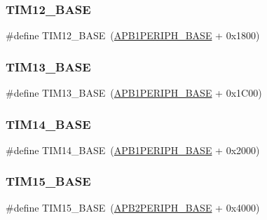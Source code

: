 \subsubsection{\texorpdfstring{TIM12\_BASE}{TIM12\_BASE}}
{\footnotesize\ttfamily \#define T\+I\+M12\+\_\+\+B\+A\+SE~(\mbox{\hyperlink{group___peripheral__memory__map_ga45666d911f39addd4c8c0a0ac3388cfb}{A\+P\+B1\+P\+E\+R\+I\+P\+H\+\_\+\+B\+A\+SE}} + 0x1800)}

\mbox{\label{group___peripheral__memory__map_gad20f79948e9359125a40bbf6ed063590}} 
\subsubsection{\texorpdfstring{TIM13\_BASE}{TIM13\_BASE}}
{\footnotesize\ttfamily \#define T\+I\+M13\+\_\+\+B\+A\+SE~(\mbox{\hyperlink{group___peripheral__memory__map_ga45666d911f39addd4c8c0a0ac3388cfb}{A\+P\+B1\+P\+E\+R\+I\+P\+H\+\_\+\+B\+A\+SE}} + 0x1\+C00)}

\mbox{\label{group___peripheral__memory__map_ga862855347d6e1d92730dfe17ee8e90b8}} 
\subsubsection{\texorpdfstring{TIM14\_BASE}{TIM14\_BASE}}
{\footnotesize\ttfamily \#define T\+I\+M14\+\_\+\+B\+A\+SE~(\mbox{\hyperlink{group___peripheral__memory__map_ga45666d911f39addd4c8c0a0ac3388cfb}{A\+P\+B1\+P\+E\+R\+I\+P\+H\+\_\+\+B\+A\+SE}} + 0x2000)}

\mbox{\label{group___peripheral__memory__map_ga7ab42ce1846930569d742d339b554078}} 
\subsubsection{\texorpdfstring{TIM15\_BASE}{TIM15\_BASE}}
{\footnotesize\ttfamily \#define T\+I\+M15\+\_\+\+B\+A\+SE~(\mbox{\hyperlink{group___peripheral__memory__map_ga25b99d6065f1c8f751e78f43ade652cb}{A\+P\+B2\+P\+E\+R\+I\+P\+H\+\_\+\+B\+A\+SE}} + 0x4000)}

